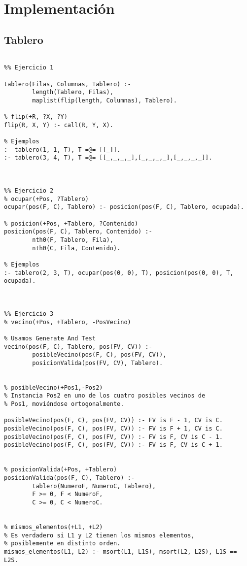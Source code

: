 \section{Implementación}

\subsection{Tablero}


\begin{verbatim}

%% Ejercicio 1

tablero(Filas, Columnas, Tablero) :-
        length(Tablero, Filas),
        maplist(flip(length, Columnas), Tablero).

% flip(+R, ?X, ?Y)
flip(R, X, Y) :- call(R, Y, X).

% Ejemplos
:- tablero(1, 1, T), T =@= [[_]].
:- tablero(3, 4, T), T =@= [[_,_,_,_],[_,_,_,_],[_,_,_,_]].



%% Ejercicio 2
% ocupar(+Pos, ?Tablero)
ocupar(pos(F, C), Tablero) :- posicion(pos(F, C), Tablero, ocupada).

% posicion(+Pos, +Tablero, ?Contenido)
posicion(pos(F, C), Tablero, Contenido) :-
        nth0(F, Tablero, Fila),
        nth0(C, Fila, Contenido).

% Ejemplos
:- tablero(2, 3, T), ocupar(pos(0, 0), T), posicion(pos(0, 0), T, ocupada).



%% Ejercicio 3
% vecino(+Pos, +Tablero, -PosVecino)

% Usamos Generate And Test
vecino(pos(F, C), Tablero, pos(FV, CV)) :-
        posibleVecino(pos(F, C), pos(FV, CV)),
        posicionValida(pos(FV, CV), Tablero).


% posibleVecino(+Pos1,-Pos2)
% Instancia Pos2 en uno de los cuatro posibles vecinos de
% Pos1, moviéndose ortogonalmente.

posibleVecino(pos(F, C), pos(FV, CV)) :- FV is F - 1, CV is C.
posibleVecino(pos(F, C), pos(FV, CV)) :- FV is F + 1, CV is C.
posibleVecino(pos(F, C), pos(FV, CV)) :- FV is F, CV is C - 1.
posibleVecino(pos(F, C), pos(FV, CV)) :- FV is F, CV is C + 1.


% posicionValida(+Pos, +Tablero)
posicionValida(pos(F, C), Tablero) :-
        tablero(NumeroF, NumeroC, Tablero),
        F >= 0, F < NumeroF,
        C >= 0, C < NumeroC.


% mismos_elementos(+L1, +L2)
% Es verdadero si L1 y L2 tienen los mismos elementos,
% posiblemente en distinto orden.
mismos_elementos(L1, L2) :- msort(L1, L1S), msort(L2, L2S), L1S == L2S.


\end{verbatim}
